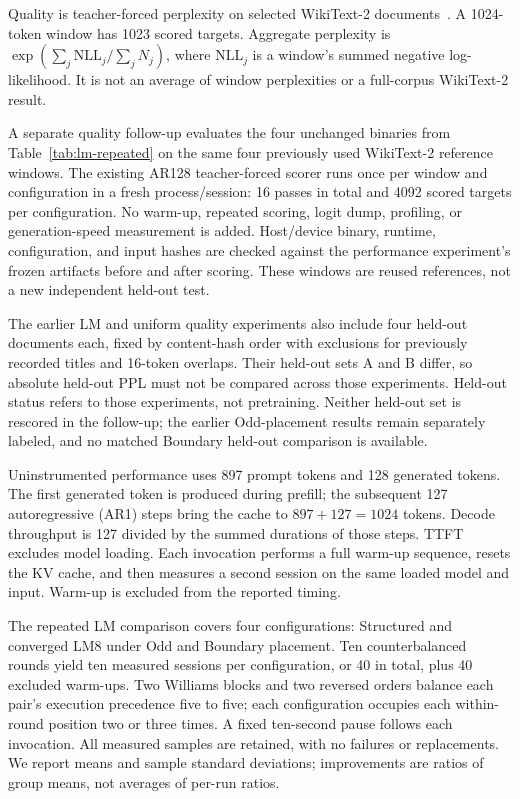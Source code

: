 \documentclass[conference,a4paper,10pt]{IEEEtran}
\begin{document}
Quality is teacher-forced perplexity on selected WikiText-2 documents~\cite{wikitext}. A 1024-token window has 1023 scored targets. Aggregate perplexity is $\exp(\sum_j\mathrm{NLL}_j/\sum_j N_j)$, where $\mathrm{NLL}_j$ is a window's summed negative log-likelihood. It is not an average of window perplexities or a full-corpus WikiText-2 result.

A separate quality follow-up evaluates the four unchanged binaries from Table~\ref{tab:lm-repeated} on the same four previously used WikiText-2 reference windows. The existing AR128 teacher-forced scorer runs once per window and configuration in a fresh process/session: 16 passes in total and 4092 scored targets per configuration. No warm-up, repeated scoring, logit dump, profiling, or generation-speed measurement is added. Host/device binary, runtime, configuration, and input hashes are checked against the performance experiment's frozen artifacts before and after scoring. These windows are reused references, not a new independent held-out test.

The earlier LM and uniform quality experiments also include four held-out documents each, fixed by content-hash order with exclusions for previously recorded titles and 16-token overlaps. Their held-out sets A and B differ, so absolute held-out PPL must not be compared across those experiments. Held-out status refers to those experiments, not pretraining. Neither held-out set is rescored in the follow-up; the earlier Odd-placement results remain separately labeled, and no matched Boundary held-out comparison is available.

Uninstrumented performance uses 897 prompt tokens and 128 generated tokens. The first generated token is produced during prefill; the subsequent 127 autoregressive (AR1) steps bring the cache to $897+127=1024$ tokens. Decode throughput is 127 divided by the summed durations of those steps. TTFT excludes model loading. Each invocation performs a full warm-up sequence, resets the KV cache, and then measures a second session on the same loaded model and input. Warm-up is excluded from the reported timing.

The repeated LM comparison covers four configurations: Structured and converged LM8 under Odd and Boundary placement. Ten counterbalanced rounds yield ten measured sessions per configuration, or 40 in total, plus 40 excluded warm-ups. Two Williams blocks and two reversed orders balance each pair's execution precedence five to five; each configuration occupies each within-round position two or three times. A fixed ten-second pause follows each invocation. All measured samples are retained, with no failures or replacements. We report means and sample standard deviations; improvements are ratios of group means, not averages of per-run ratios.
\end{document}
